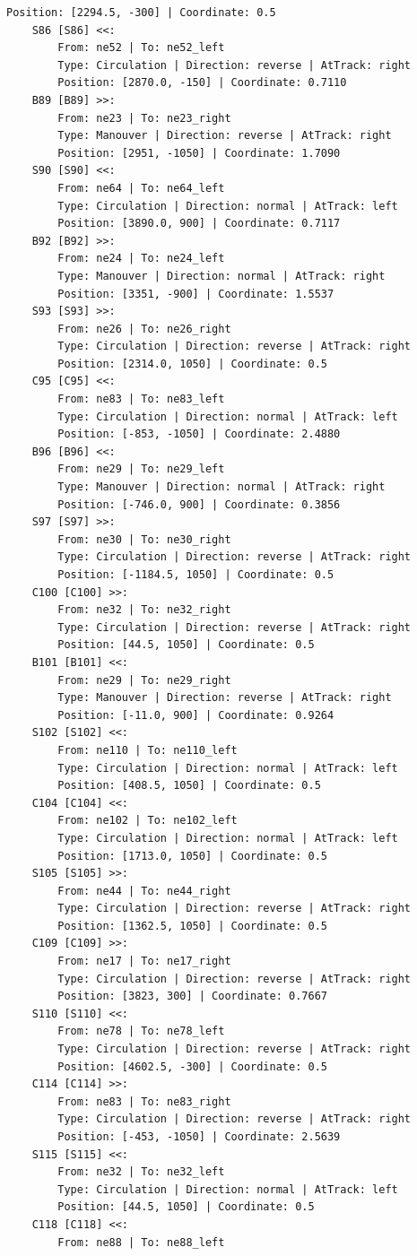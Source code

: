 \begin{lstlisting}[language = {}, tabsize=4, basicstyle=\footnotesize\ttfamily, showspaces=false, showstringspaces=false, caption = Signalling.RNA, label = {lst:EJ3_6}]
		Position: [2294.5, -300] | Coordinate: 0.5
	S86 [S86] <<:
		From: ne52 | To: ne52_left
		Type: Circulation | Direction: reverse | AtTrack: right 
		Position: [2870.0, -150] | Coordinate: 0.7110
	B89 [B89] >>:
		From: ne23 | To: ne23_right
		Type: Manouver | Direction: reverse | AtTrack: right 
		Position: [2951, -1050] | Coordinate: 1.7090
	S90 [S90] <<:
		From: ne64 | To: ne64_left
		Type: Circulation | Direction: normal | AtTrack: left 
		Position: [3890.0, 900] | Coordinate: 0.7117
	B92 [B92] >>:
		From: ne24 | To: ne24_left
		Type: Manouver | Direction: normal | AtTrack: right 
		Position: [3351, -900] | Coordinate: 1.5537
	S93 [S93] >>:
		From: ne26 | To: ne26_right
		Type: Circulation | Direction: reverse | AtTrack: right 
		Position: [2314.0, 1050] | Coordinate: 0.5
	C95 [C95] <<:
		From: ne83 | To: ne83_left
		Type: Circulation | Direction: normal | AtTrack: left 
		Position: [-853, -1050] | Coordinate: 2.4880
	B96 [B96] <<:
		From: ne29 | To: ne29_left
		Type: Manouver | Direction: normal | AtTrack: right 
		Position: [-746.0, 900] | Coordinate: 0.3856
	S97 [S97] >>:
		From: ne30 | To: ne30_right
		Type: Circulation | Direction: reverse | AtTrack: right 
		Position: [-1184.5, 1050] | Coordinate: 0.5
	C100 [C100] >>:
		From: ne32 | To: ne32_right
		Type: Circulation | Direction: reverse | AtTrack: right 
		Position: [44.5, 1050] | Coordinate: 0.5
	B101 [B101] <<:
		From: ne29 | To: ne29_right
		Type: Manouver | Direction: reverse | AtTrack: right 
		Position: [-11.0, 900] | Coordinate: 0.9264
	S102 [S102] <<:
		From: ne110 | To: ne110_left
		Type: Circulation | Direction: normal | AtTrack: left 
		Position: [408.5, 1050] | Coordinate: 0.5
	C104 [C104] <<:
		From: ne102 | To: ne102_left
		Type: Circulation | Direction: normal | AtTrack: left 
		Position: [1713.0, 1050] | Coordinate: 0.5
	S105 [S105] >>:
		From: ne44 | To: ne44_right
		Type: Circulation | Direction: reverse | AtTrack: right 
		Position: [1362.5, 1050] | Coordinate: 0.5
	C109 [C109] >>:
		From: ne17 | To: ne17_right
		Type: Circulation | Direction: reverse | AtTrack: right 
		Position: [3823, 300] | Coordinate: 0.7667
	S110 [S110] <<:
		From: ne78 | To: ne78_left
		Type: Circulation | Direction: reverse | AtTrack: right 
		Position: [4602.5, -300] | Coordinate: 0.5
	C114 [C114] >>:
		From: ne83 | To: ne83_right
		Type: Circulation | Direction: reverse | AtTrack: right 
		Position: [-453, -1050] | Coordinate: 2.5639
	S115 [S115] <<:
		From: ne32 | To: ne32_left
		Type: Circulation | Direction: normal | AtTrack: left 
		Position: [44.5, 1050] | Coordinate: 0.5
	C118 [C118] <<:
		From: ne88 | To: ne88_left

\end{lstlisting}
